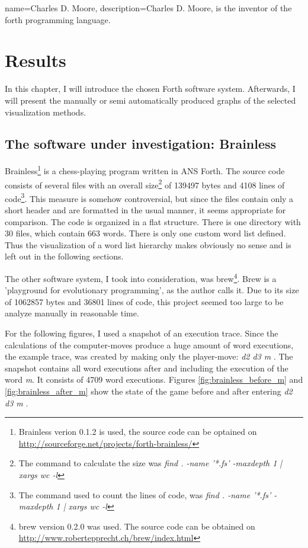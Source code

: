 {
  name={Charles D. Moore},
  description={Charles D. Moore, is the inventor of the forth programming language.}
}

\chapter{Results}
\label{chap:Results}

In this chapter, I will introduce the chosen Forth software system. Afterwards, I will present the manually or semi automatically produced graphs of the selected visualization methods.

\section{The software under investigation: Brainless}

Brainless\footnote{Brainless verion 0.1.2 is used, the source code can be optained on \url{http://sourceforge.net/projects/forth-brainless/}} is a chess-playing program written in ANS Forth. The source code consists of several files with an overall size\footnote{The command to calculate the size was \emph{find . -name '*.fs' -maxdepth 1 | xargs wc -l}} of 139497 bytes and 4108 lines of code\footnote{The command used to count the lines of code, was \emph{find . -name '*.fs' -maxdepth 1 | xargs wc -l}}.
This measure is somehow controversial, but since the files contain only a short header and are formatted in the usual manner, it seems appropriate for comparison. The code is organized in a flat structure. There is one directory with 30 files, which contain 663 words. There is only one custom word list defined. Thus the visualization of a word list hierarchy makes obviously no sense and is left out in the following sections.

The other software system, I took into consideration, was brew\footnote{brew version 0.2.0 was used. The source code can be obtained on \url{http://www.robertepprecht.ch/brew/index.html}}. Brew is a 'playground for evolutionary programming', as the author calls it. Due to its size of 1062857 bytes and 36801 lines of code, this project seemed too large to be analyze manually in reasonable time.

For the following figures, I used a snapshot of an execution trace.
Since the calculations of the computer-moves produce a huge amount of word executions, the example trace, was created by making only the player-move: \emph{d2 d3 m} \keys{\return}. The snapshot contains all word executions after and including the execution of the word \emph{m}. It consists of 4709 word executions. Figures \ref{fig:brainless_before_m} and \ref{fig:brainless_after_m} show the state of the game before and after entering \emph{d2 d3 m} \keys{\return}.

